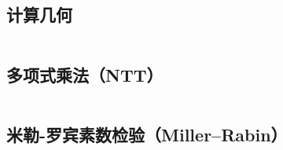 \documentclass[a4paper]{article}
\begin{document}
\begin{spacing}{0.6}

\newpage
\subsection{计算几何}
\inputminted{cpp}{\detokenize{Template/数学/07 - 计算几何.txt}}

\newpage
\subsection{多项式乘法（NTT）}
\inputminted{cpp}{\detokenize{Template/数学/08- 多项式乘法（NTT）.txt}}

\subsection{米勒-罗宾素数检验（Miller–Rabin）}
\inputminted{cpp}{\detokenize{Template/数学/09 - 米勒-罗宾素数检验（Miller–Rabin）.txt}}
\newpage

\end{spacing}
\end{document}
